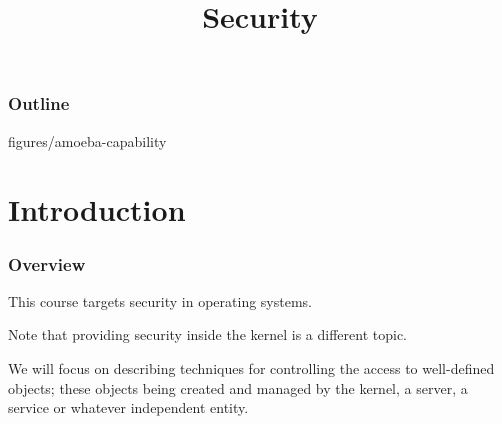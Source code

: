 %
%
%
%
%
%

%
%

%
%

\def\path{../../../..}

%
%



%
%

\title{Security}

%
%



%
%

\begin{frame}
  \titlepage
\end{frame}

%
%

\begin{frame}
  \frametitle{Outline}

  \tableofcontents
\end{frame}

%
%

                {figures/amoeba-capability}

%
%

%
%

\section{Introduction}


\begin{frame}
  \frametitle{Overview}

  This course targets security in operating systems.

  \-

  Note that providing security inside the kernel is a different topic.

  \-

  We will focus on describing techniques for controlling the access to
  well-defined objects; these objects being created and managed by the kernel,
  a server, a service or whatever independent entity.
\end{frame}

